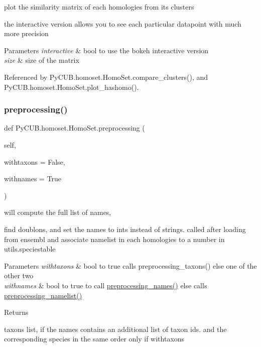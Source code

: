 plot the similarity matrix of each homologies from its clusters 

the interactive version allows you to see each particular datapoint with much more precision


\begin{DoxyParams}{Parameters}
{\em interactive} & bool to use the bokeh interactive version \\
\hline
{\em size} & size of the matrix \\
\hline
\end{DoxyParams}


Referenced by Py\+C\+U\+B.\+homoset.\+Homo\+Set.\+compare\+\_\+clusters(), and Py\+C\+U\+B.\+homoset.\+Homo\+Set.\+plot\+\_\+hashomo().

\mbox{\label{class_py_c_u_b_1_1homoset_1_1_homo_set_a3f689e03251e7b4fe262a86d08946998}} 
\subsubsection{\texorpdfstring{preprocessing()}{preprocessing()}}
{\footnotesize\ttfamily def Py\+C\+U\+B.\+homoset.\+Homo\+Set.\+preprocessing (\begin{DoxyParamCaption}\item[{}]{self,  }\item[{}]{withtaxons = {\ttfamily False},  }\item[{}]{withnames = {\ttfamily True} }\end{DoxyParamCaption})}



will compute the full list of names, 

find doublons, and set the names to ints instead of strings. called after loading from ensembl and associate namelist in each homologies to a number in utils.\+speciestable


\begin{DoxyParams}{Parameters}
{\em withtaxons} & bool to true calls preprocessing\+\_\+taxons() else one of the other two \\
\hline
{\em withnames} & bool to true to call \mbox{\hyperlink{class_py_c_u_b_1_1homoset_1_1_homo_set_a36cf71a7bc24b788c4d526591a8ec376}{preprocessing\+\_\+names()}} else calls \mbox{\hyperlink{class_py_c_u_b_1_1homoset_1_1_homo_set_a4060c440127aa861c17b6157c81e2d27}{preprocessing\+\_\+namelist()}}\\
\hline
\end{DoxyParams}
\begin{DoxyReturn}{Returns}


taxons list, if the names contains an additional list of taxon ids. and the corresponding species in the same order only if withtaxons 
\end{DoxyReturn}


